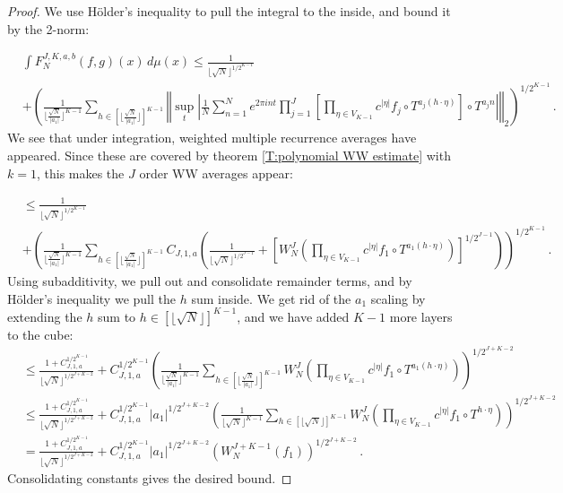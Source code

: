 \documentclass[11pt, oneside]{amsart}   	%
\newcommand{\1}{\mathbbm{1}}
\newcommand{\floor}[1]{\lfloor#1\rfloor}
\theoremstyle{definition}
\begin{document}
\begin{proof}

We use Hölder's inequality to pull the integral to the inside, and bound it by the 2-norm:

\begin{align*}
&\int F_N^{J, K, a, b}(f, g)(x) \, d\mu(x)
\leq \frac{1}{\floor{\sqrt{N}}^{1/2^{K-1}}}\\ &+\left(\frac{1}{\floor{\frac{\sqrt{N}}{|a_1|}}^{K-1}} \sum_{h \in \left[\floor{\frac{\sqrt{N}}{|a_1|}}\right]^{K-1}} \left\Vert \sup_{t} \left| \frac{1}{N} \sum_{n=1}^N e^{2\pi i n t} \prod_{j=1}^J \left[\prod_{\eta\in V_{K-1}} c^{|\eta|} f_j \circ T^{a_j (h \cdot \eta)}\right]\circ T^{a_j n}\right| \right\Vert_2 \right)^{1/2^{K-1}} \, .
\end{align*}
We see that under integration, weighted multiple recurrence averages have appeared. Since these are covered by theorem \ref{T:polynomial WW estimate} with $k=1$, this makes the $J$ order WW averages appear:

\begin{align*}
&\leq \frac{1}{\floor{\sqrt{N}}^{1/2^{K-1}}}\\ &+\left(\frac{1}{\floor{\frac{\sqrt{N}}{|a_1|}}^{K-1}} \sum_{h \in \left[\floor{\frac{\sqrt{N}}{|a_1|}}\right]^{K-1}} C_{J, 1, a}\left( \frac{1}{\floor{\sqrt{N}}^{1/2^{J-1}}} + \left[ W_N^{J}\left( \prod_{\eta\in V_{K-1}} c^{|\eta|} f_1 \circ T^{a_1 (h \cdot \eta)}\right)\right]^{1/2^{J-1}}\right) \right)^{1/2^{K-1}} \, .
\end{align*}
Using subadditivity, we pull out and consolidate remainder terms, and by Hölder's inequality we pull the $h$ sum inside. We get rid of the $a_1$ scaling by extending the $h$ sum to $h\in \left[ \floor{\sqrt{N}}\right]^{K-1}$, and we have added $K-1$ more layers to the cube:
\begin{align*}
&\leq \frac{1+ C_{J, 1, a}^{1/2^{K-1}}}{\floor{\sqrt{N}}^{1/2^{J+K-2}}}+ C_{J, 1, a}^{1/2^{K-1}}\left( \frac{1}{\floor{\frac{\sqrt{N}}{|a_1|}}^{K-1}} \sum_{h \in \left[\floor{\frac{\sqrt{N}}{|a_1|}}\right]^{K-1}} W_N^{J}\left( \prod_{\eta\in V_{K-1}} c^{|\eta|} f_1 \circ T^{a_1 (h \cdot \eta)}\right) \right)^{1/2^{J+K-2}} \\
&\leq \frac{1+ C_{J, 1, a}^{1/2^{K-1}}}{\floor{\sqrt{N}}^{1/2^{J+K-2}}}+ C_{J, 1, a}^{1/2^{K-1}}|a_1|^{1/2^{J+K-2}}\left( \frac{1}{\floor{\sqrt{N}}^{K-1}} \sum_{h \in \left[\floor{\sqrt{N}}\right]^{K-1}} W_N^{J}\left( \prod_{\eta\in V_{K-1}} c^{|\eta|} f_1 \circ T^{h \cdot \eta}\right)  \right)^{1/2^{J+K-2}} \\
&= \frac{1+ C_{J, 1, a}^{1/2^{K-1}}}{\floor{\sqrt{N}}^{1/2^{J+K-2}}}+ C_{J, 1, a}^{1/2^{K-1}}|a_1|^{1/2^{J+K-2}}\left(  W_N^{J+K-1}\left( f_1 \right)  \right)^{1/2^{J+K-2}} \, .
\end{align*}
Consolidating constants gives the desired bound.

\end{proof}
\end{document}
